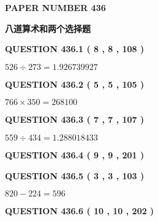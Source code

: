 \documentclass{ctexart}
\begin{document}
   
 {\textbf{ \Large{ PAPER NUMBER  436  }}}
   
   
\vspace{0.2in}
   
   
   
   
   
   
 \vspace{0.2in}
{\LARGE {\textbf{ 八道算术和两个选择题}}}
   
   
  
\vspace{0.2in}
  
{\textbf{\Large{QUESTION
436.1 
 ( 8 , 8 , 108 )
}}}
  
  
 
 

$ %
526 \div  %
273=   %
1.926739927$
 
 
  
\vspace{0.2in}
  
{\textbf{\Large{QUESTION
436.2 
 ( 5 , 5 , 105 )
}}}
  
  
 
 

$ %
766 \times  %
350=   %
268100$
 
 
  
\vspace{0.2in}
  
{\textbf{\Large{QUESTION
436.3 
 ( 7 , 7 , 107 )
}}}
  
  
 
 

$ %
559 \div  %
434=   %
1.288018433$
 
 
  
\vspace{0.2in}
  
{\textbf{\Large{QUESTION
436.4 
 ( 9 , 9 , 201 )
}}}
  
  
  
\vspace{0.2in}
  
{\textbf{\Large{QUESTION
436.5 
 ( 3 , 3 , 103 )
}}}
  
  
 
 

$ %
820 -  %
224=   %
596$
 
 
  
\vspace{0.2in}
  
{\textbf{\Large{QUESTION
436.6 
 ( 10 , 10 , 202 )
}}}
  
\end{document}
